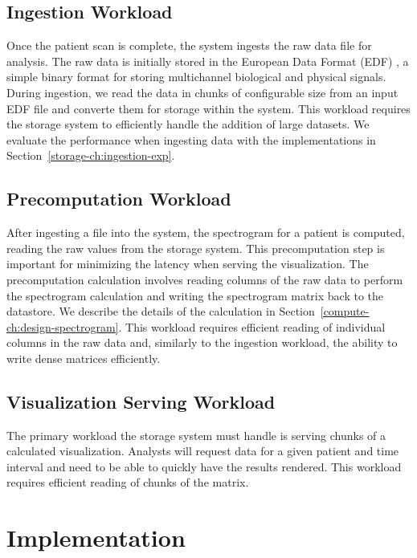 \subsection{Ingestion Workload}

Once the patient scan is complete, the system ingests the raw data file for
analysis. The raw data is initially stored in the European Data Format (EDF)
\cite{edf}, a simple binary format for storing multichannel biological and
physical signals. During ingestion, we read the data in chunks of configurable
size from an input EDF file and converte them for storage within the system.
This workload requires the storage system to efficiently handle the addition of
large datasets. We evaluate the performance when ingesting data with the
implementations in Section~\ref{storage-ch:ingestion-exp}.


\subsection{Precomputation Workload}

After ingesting a file into the system, the spectrogram for a patient is
computed, reading the raw values from the storage system. This precomputation
step is important for minimizing the latency when serving the visualization.
The precomputation calculation involves reading columns of the raw data to
perform the spectrogram calculation and writing the spectrogram matrix back to
the datastore. We describe the details of the calculation in
Section~\ref{compute-ch:design-spectrogram}. This workload requires efficient
reading of individual columns in the raw data and, similarly to the ingestion
workload, the ability to write dense matrices efficiently.

\subsection{Visualization Serving Workload}

The primary workload the storage system must handle is serving chunks of a
calculated visualization. Analysts will request data for a given patient and
time interval and need to be able to quickly have the results rendered. This
workload requires efficient reading of chunks of the matrix.

\section{Implementation}


